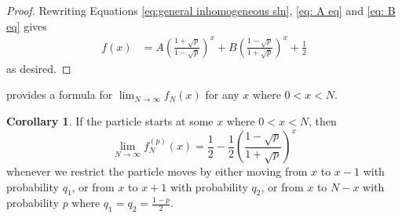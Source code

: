 \documentclass[reqno]{amsart}
\theoremstyle{definition}
\newtheorem{corollary}{Corollary}[theorem]
\theoremstyle{definition}
\theoremstyle{remark}
\begin{document}
\begin{proof}
   Rewriting Equations \ref{eq:general inhomogeneous sln}, \ref{eq: A eq} and \ref{eq: B eq} gives
   \begin{align*}
       f(x)&=A\left(\frac{1+\sqrt{p}}{1-\sqrt{p}}\right)^x+B\left(\frac{1-\sqrt{p}}{1+\sqrt{p}}\right)^x+\frac{1}{2} 
   \end{align*}
as desired.
\end{proof}

 provides a formula for $\lim_{N\to\infty}f_N(x)$ for any $x$ where $0<x<N$.

\begin{corollary}\label{cor:probability at infinity}
If the particle starts at some $x$ where $0<x<N$, then
\[\lim_{N\to \infty} f_N^{(p)}(x)=\frac{1}{2}-\frac{1}{2}\left(\frac{1-\sqrt{p}}{1+\sqrt{p}}\right)^x\]
whenever we restrict the particle moves by either moving from $x$ to $x-1$ with probability $q_1$, or from $x$ to $x+1$ with probability $q_2$, or from $x$ to $N-x$ with probability $p$ where $q_1=q_2=\frac{1-p}{2}$.
\end{corollary}
\end{document}
